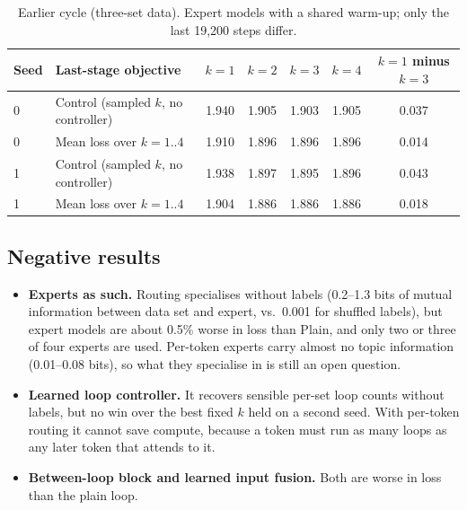 \documentclass[11pt]{article}
\begin{document}
\begin{table}[t]
\centering\small
\begin{tabular}{llccccc}
\toprule
Seed & Last-stage objective & $k{=}1$ & $k{=}2$ & $k{=}3$ & $k{=}4$ & $k{=}1$ minus $k{=}3$ \\
\midrule
0 & Control (sampled $k$, no controller) & 1.940 & 1.905 & 1.903 & 1.905 & 0.037 \\
0 & Mean loss over $k=1..4$ & 1.910 & 1.896 & 1.896 & 1.896 & 0.014 \\
1 & Control (sampled $k$, no controller) & 1.938 & 1.897 & 1.895 & 1.896 & 0.043 \\
1 & Mean loss over $k=1..4$ & 1.904 & 1.886 & 1.886 & 1.886 & 0.018 \\
\bottomrule
\end{tabular}
\caption{Earlier cycle (three-set data). Expert models with a shared warm-up; only the last 19{,}200 steps differ.}
\label{tab:avg}
\end{table}

\subsection{Negative results}
\begin{itemize}\setlength\itemsep{1pt}
\item \textbf{Experts as such.} Routing specialises without labels (0.2--1.3 bits of mutual information between data set and expert, vs.\ 0.001 for shuffled labels), but expert models are about 0.5\% worse in loss than Plain, and only two or three of four experts are used. Per-token experts carry almost no topic information (0.01--0.08 bits), so what they specialise in is still an open question.
\item \textbf{Learned loop controller.} It recovers sensible per-set loop counts without labels, but no win over the best fixed $k$ held on a second seed. With per-token routing it cannot save compute, because a token must run as many loops as any later token that attends to it.
\item \textbf{Between-loop block and learned input fusion.} Both are worse in loss than the plain loop.
\end{itemize}
\end{document}
